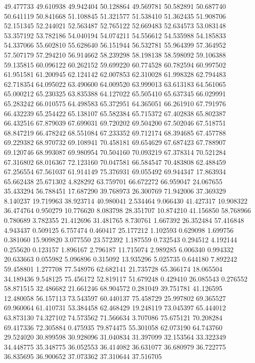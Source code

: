 49.477733
49.610938
49.942404
50.128864
49.569781
50.582891
50.687740
50.641119
50.841668
51.108845
51.321577
51.538410
51.362435
51.908706
52.151345
52.244021
52.563487
52.765122
52.669483
52.634573
53.083148
53.357192
53.782186
54.040194
54.074211
54.556612
54.535988
54.185833
54.337066
55.602810
55.628640
56.151944
56.532781
55.964399
57.364952
57.507179
57.294210
56.914662
58.239298
58.198138
58.598092
59.106388
59.135815
60.096122
60.262152
59.699220
60.774528
60.782594
60.997502
61.951581
61.200945
62.124142
62.007853
62.310028
61.998328
62.794483
62.718354
64.095022
63.490600
64.009520
63.999013
63.613183
64.561065
65.000212
65.230325
63.835388
64.127022
65.505410
65.637345
66.029991
65.283242
66.010575
64.498583
65.372951
64.365051
66.261910
67.791976
66.432239
65.254422
65.138107
65.582384
65.715372
67.402838
65.802387
66.432516
67.879039
67.699031
69.720202
69.504200
67.502046
67.518751
68.847219
66.478242
68.551084
67.233352
69.712174
68.394685
67.457788
69.229382
68.970732
69.108941
70.458181
69.654629
67.687423
67.788907
69.120746
68.993087
69.980954
70.504160
70.093219
67.378314
70.521284
67.316802
68.016367
72.123160
70.047581
66.584547
70.483808
62.488459
67.256554
67.561037
61.914149
75.376931
69.055492
69.944347
17.863934
65.662438
25.671302
4.828292
63.759701
66.672272
66.959047
24.067655
35.433294
56.788451
17.687290
39.768973
26.300769
71.942006
37.369329
8.140237
19.719963
38.923714
40.980041
2.534464
9.066430
41.427317
10.908322
36.474764
0.950279
10.776620
8.083798
28.351707
10.874210
41.156850
58.768966
0.780689
3.782355
21.412696
31.481765
8.730761
1.667392
26.352484
57.416848
4.943437
0.509125
6.757474
0.460417
25.177212
1.102593
0.629098
1.699756
0.381060
15.909820
3.077550
23.572392
1.187559
0.732543
0.294512
4.192144
0.255620
0.123157
1.896167
2.796187
11.715074
2.989285
6.006340
0.994332
20.633663
0.055982
5.096896
0.315092
13.935296
5.025735
0.644180
7.892242
59.458801
1.277708
77.548976
62.682141
21.735728
65.366174
18.065504
34.189436
9.548125
75.456172
52.819117
51.679248
0.429410
26.085543
0.276552
58.871515
32.486682
21.661246
68.904572
0.281049
39.751781
41.126595
12.480058
56.157113
73.543597
60.440137
75.458729
25.997802
69.365527
69.960064
61.410731
53.384458
62.468429
19.248119
73.045397
65.444012
63.873130
74.327102
74.573562
71.566634
3.707086
75.675121
70.208284
69.417336
72.305884
0.475935
79.874475
55.301058
62.073190
64.743760
29.524020
30.899598
30.928096
31.040834
31.397099
32.153564
33.322349
34.448775
35.348775
36.052553
36.414082
36.631077
36.680979
36.722775
36.835695
36.900652
37.073362
37.310644
37.516705

